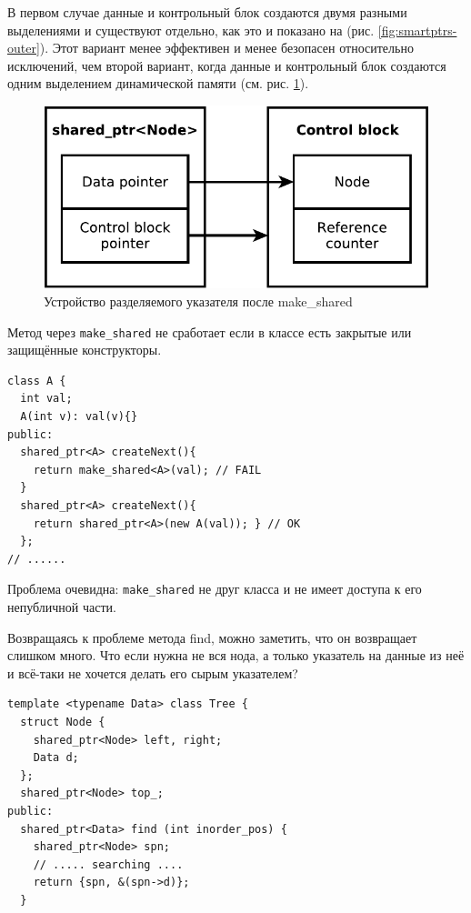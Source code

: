 \documentclass[a4paper,12pt,oneside]{book}
\begin{document}
В первом случае данные и контрольный блок создаются двумя разными выделениями и существуют отдельно, как это и показано на (рис. \ref{fig:smartptrs-outer}). Этот вариант менее эффективен и менее безопасен относительно исключений, чем второй вариант, когда данные и контрольный блок создаются одним выделением динамической памяти (см. рис. \ref{fig:smartptrs-inner}).

\begin{figure}[ht]
\centering
\includegraphics[width=1.0\textwidth]{illustrations/smartptrs-inner-crop.pdf}
\caption{Устройство разделяемого указателя после make\_shared}
\label{fig:smartptrs-inner}
\end{figure}

Метод через \lstinline!make_shared! не сработает если в классе есть закрытые или защищённые конструкторы.

\begin{lstlisting}
class A {
  int val;
  A(int v): val(v){}
public:
  shared_ptr<A> createNext(){ 
    return make_shared<A>(val); // FAIL 
  }
  shared_ptr<A> createNext(){ 
    return shared_ptr<A>(new A(val)); } // OK
  };
// ......
\end{lstlisting}

Проблема очевидна: \lstinline!make_shared! не друг класса и не имеет доступа к его непубличной части.

Возвращаясь к проблеме метода find, можно заметить, что он возвращает слишком много. Что если нужна не вся нода, а только указатель на данные из неё и всё-таки не хочется делать его сырым указателем?

\begin{lstlisting}
template <typename Data> class Tree {
  struct Node {
    shared_ptr<Node> left, right;
    Data d;
  };
  shared_ptr<Node> top_;
public: 
  shared_ptr<Data> find (int inorder_pos) {
    shared_ptr<Node> spn;
    // ..... searching ....
    return {spn, &(spn->d)};
  }
\end{lstlisting}
\end{document}
